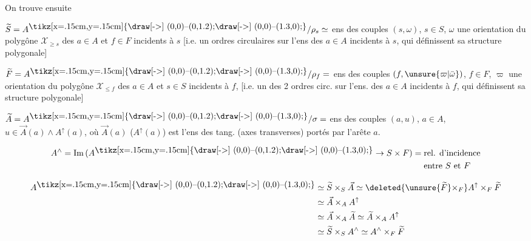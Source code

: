 On trouve ensuite

$\widetilde S=A^{\vcenter{\hbox{\tikz[x=.15cm,y=.15cm]{\draw[->] (0,0)--(0,1.2);\draw[->] (0,0)--(1.3,0);}}}}/\rho_s\simeq$ ens des couples $(s,\omega)$, $s\in S$, $\omega$ une orientation du 
polygône $\mathcal X_{\geq s}$ des $a\in A$ et $f\in F$ incidents à $s$
[i.e. un  ordres circulaires sur l'ens des $a\in A$ incidents à $s$, qui définissent sa structure polygonale]

$\widetilde F=A^{\vcenter{\hbox{\tikz[x=.15cm,y=.15cm]{\draw[->] (0,0)--(0,1.2);\draw[->] (0,0)--(1.3,0);}}}}/\rho_f=$ ens des couples $(f,\unsure{\varpi|\bar\omega})$, $f\in F$, $\varpi$ une orientation du
polygône $\mathcal X_{\leq f}$ des  $a\in A$ et $s\in S$ incidents à $f$,
[i.e. un des 2 ordres circ. sur l'ens. des
$a\in A$ incidents à $f$, qui définissent sa structure polygonale]

$\widetilde A=A^{\vcenter{\hbox{\tikz[x=.15cm,y=.15cm]{\draw[->] (0,0)--(0,1.2);\draw[->] (0,0)--(1.3,0);}}}}/\sigma=$ ens des couples $(a,u)$, $a\in A$, $u\in\vec A(a)\wedge A^\uparrow(a)$,
où $\vec A(a)$ ($A^\uparrow(a)$) est l'ens des  tang.
(axes transverses) portés par l'arête $a$.

\[
A^\wedge=\mathrm{Im}\,(A^{\vcenter{\hbox{\tikz[x=.15cm,y=.15cm]{\draw[->] (0,0)--(0,1.2);\draw[->] (0,0)--(1.3,0);}}}}\to S\times F)
=\begin{aligned}[t]&\text{rel. d'incidence}\\&\text{entre }S\text{ et }F\end{aligned}
\]


\[
\begin{aligned}
A^{\vcenter{\hbox{\tikz[x=.15cm,y=.15cm]{\draw[->] (0,0)--(0,1.2);\draw[->] (0,0)--(1.3,0);}}}}&\simeq\widetilde S\times_S\vec A\simeq\deleted{\unsure{\widetilde F}\times_F}A^\uparrow\times_F\widetilde F\\
&\simeq\vec A\times_A A^\uparrow\\
&\simeq\vec A\times_A\widetilde A\simeq\widetilde A\times_A A^\uparrow\\
&\simeq\widetilde S\times_S A^\wedge\simeq A^\wedge\times_F\widetilde F
\end{aligned}
\]


